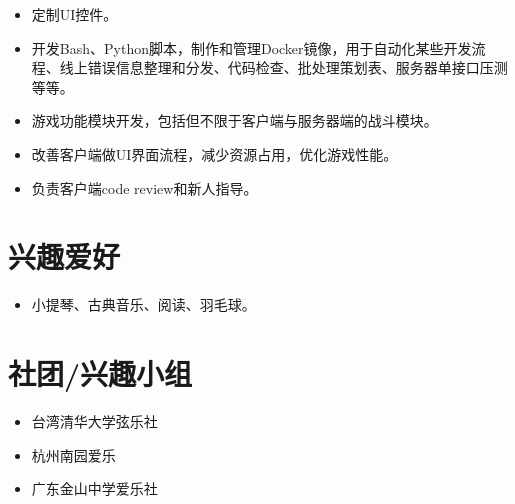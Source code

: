 \documentclass[letterpaper]{article}
\begin{document}
\begin{itemize}
\begin{itemize}
\begin{itemize}
          \item 定制UI控件。
          \item 开发Bash、Python脚本，制作和管理Docker镜像，用于自动化某些开发流程、线上错误信息整理和分发、代码检查、批处理策划表、服务器单接口压测等等。
          \item 游戏功能模块开发，包括但不限于客户端与服务器端的战斗模块。
          \item 改善客户端做UI界面流程，减少资源占用，优化游戏性能。
          \item 负责客户端code review和新人指导。
        \end{itemize}
    \end{itemize}
\end{itemize}

\section*{兴趣爱好}
\begin{itemize}
  \item 小提琴、古典音乐、阅读、羽毛球。
\end{itemize}


\section*{社团/兴趣小组}
\begin{itemize}
  \item 台湾清华大学弦乐社
  \item 杭州南园爱乐
  \item 广东金山中学爱乐社
\end{itemize}
\end{document}
